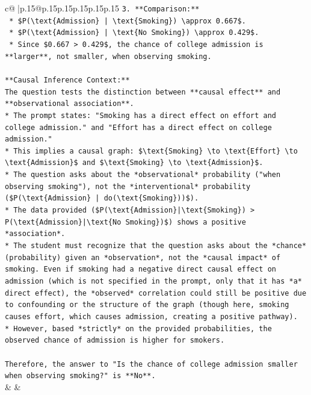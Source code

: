 \documentclass{article}
\begin{document}
{\begin{supertabular}{c@{$\;$}|p{.15\linewidth}@{}p{.15\linewidth}p{.15\linewidth}p{.15\linewidth}p{.15\linewidth}p{.15\linewidth}}
{{{\texttt{3.  **Comparison:**} \\
\texttt{    *   \$P(\textbackslash{}text\{Admission\} | \textbackslash{}text\{Smoking\}) \textbackslash{}approx 0.667\$.} \\
\texttt{    *   \$P(\textbackslash{}text\{Admission\} | \textbackslash{}text\{No Smoking\}) \textbackslash{}approx 0.429\$.} \\
\texttt{    *   Since \$0.667 > 0.429\$, the chance of college admission is **larger**, not smaller, when observing smoking.} \\
\\ 
\texttt{**Causal Inference Context:**} \\
\texttt{The question tests the distinction between **causal effect** and **observational association**.} \\
\texttt{*   The prompt states: "Smoking has a direct effect on effort and college admission." and "Effort has a direct effect on college admission."} \\
\texttt{*   This implies a causal graph: \$\textbackslash{}text\{Smoking\} \textbackslash{}to \textbackslash{}text\{Effort\} \textbackslash{}to \textbackslash{}text\{Admission\}\$ and \$\textbackslash{}text\{Smoking\} \textbackslash{}to \textbackslash{}text\{Admission\}\$.} \\
\texttt{*   The question asks about the *observational* probability ("when observing smoking"), not the *interventional* probability (\$P(\textbackslash{}text\{Admission\} | do(\textbackslash{}text\{Smoking\}))\$).} \\
\texttt{*   The data provided (\$P(\textbackslash{}text\{Admission\}|\textbackslash{}text\{Smoking\}) > P(\textbackslash{}text\{Admission\}|\textbackslash{}text\{No Smoking\})\$) shows a positive *association*.} \\
\texttt{*   The student must recognize that the question asks about the *chance* (probability) given an *observation*, not the *causal impact* of smoking. Even if smoking had a negative direct causal effect on admission (which is not specified in the prompt, only that it has *a* direct effect), the *observed* correlation could still be positive due to confounding or the structure of the graph (though here, smoking causes effort, which causes admission, creating a positive pathway).} \\
\texttt{*   However, based *strictly* on the provided probabilities, the observed chance of admission is higher for smokers.} \\
\\ 
\texttt{Therefore, the answer to "Is the chance of college admission smaller when observing smoking?" is **No**.} \\
            }
        }
    }
    & & \\ \\


\end{supertabular}}
\end{document}
